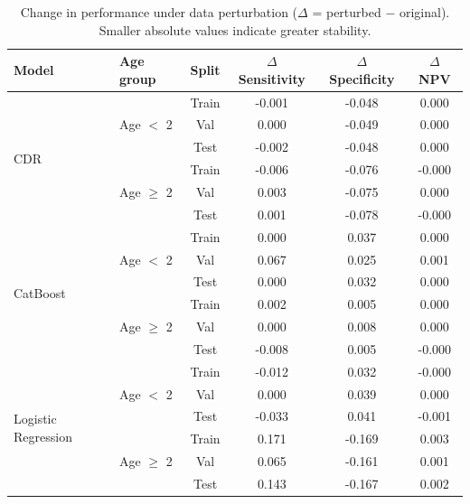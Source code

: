 \documentclass[10pt,letterpaper]{article}
\begin{document}
\renewcommand{\arraystretch}{0.85}
\begin{table}[htbp]
\centering
\small
\caption{Change in performance under data perturbation 
($\Delta$ = perturbed − original). Smaller absolute values indicate greater stability.}
\label{tab:stability}
\begin{tabular}{llcccc}
\toprule
Model & Age group & Split 
& $\Delta$ Sensitivity 
& $\Delta$ Specificity 
& $\Delta$ NPV \\
\midrule

\multirow{6}{*}{CDR}
& \multirow{3}{*}{Age $<$ 2}
    & Train & -0.001 & -0.048 &  0.000 \\
&   & Val   &  0.000 & -0.049 &  0.000 \\
&   & Test  & -0.002 & -0.048 &  0.000 \\
\cmidrule(lr){2-6} 
& \multirow{3}{*}{Age $\geq$ 2}
    & Train & -0.006 & -0.076 & -0.000 \\
&   & Val   &  0.003 & -0.075 &  0.000 \\
&   & Test  &  0.001 & -0.078 & -0.000 \\

\midrule

\multirow{6}{*}{CatBoost}
& \multirow{3}{*}{Age $<$ 2}
    & Train &  0.000 &  0.037 & 0.000 \\
&   & Val   &  0.067 &  0.025 & 0.001 \\
&   & Test  &  0.000 &  0.032 & 0.000 \\
\cmidrule(lr){2-6} 
& \multirow{3}{*}{Age $\geq$ 2}
    & Train &  0.002 &  0.005 & 0.000 \\
&   & Val   &  0.000 &  0.008 & 0.000 \\
&   & Test  & -0.008 &  0.005 & -0.000 \\

\midrule

\multirow{6}{*}{Logistic Regression}
& \multirow{3}{*}{Age $<$ 2}
    & Train & -0.012 &  0.032 & -0.000 \\
&   & Val   &  0.000 &  0.039 &  0.000 \\
&   & Test  & -0.033 &  0.041 & -0.001 \\
\cmidrule(lr){2-6} 
& \multirow{3}{*}{Age $\geq$ 2}
    & Train &  0.171 & -0.169 & 0.003 \\
&   & Val   &  0.065 & -0.161 & 0.001 \\
&   & Test  &  0.143 & -0.167 & 0.002 \\

\bottomrule
\end{tabular}
\end{table}
\end{document}
